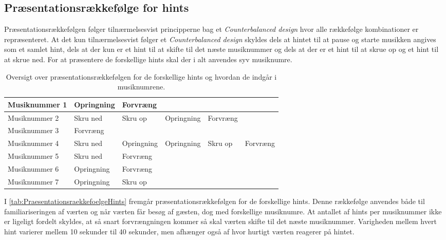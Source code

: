 \subsection{Præsentationsrækkefølge for hints}
\label{PraesentationsraekkefoelgeSocialAccept}
%
Præsentationsrækkefølgen følger tilnærmelsesvist principperne bag et \textit{Counterbalanced design} hvor alle rækkefølge kombinationer er repræsenteret. At det kun tilnærmelsesvist følger et \textit{Counterbalanced design} skyldes dels at hintet til at pause og starte musikken angives som et samlet hint, dels at der kun er et hint til at skifte til det næste musiknummer og dels at der er et hint til at skrue op og et hint til at skrue ned. For at præsentere de forskellige hints skal der i alt anvendes syv musiknumre.
%
\begin{table}[H]
	\centering
	\begin{tabular}{ | p{2.8cm}| p{1.85cm}| p{1.85cm} | p{1.85cm} | p{1.85cm} | p{1.85cm}|}
		\hline
		Musiknummer 1 & Opringning & Forvræng & & & \\ \hline
		Musiknummer 2 & Skru ned & Skru op & Opringning & Forvræng & \\ \hline
		Musiknummer 3 & Forvræng & & & &  \\ \hline
		Musiknummer 4 & Skru ned & Opringning & Opringning & Skru op & Forvræng\\ \hline
		Musiknummer 5 & Skru ned & Forvræng & & & \\ \hline
		Musiknummer 6 & Opringning & Forvræng & & & \\ \hline
		Musiknummer 7 & Opringning & Skru op & & & \\ \hline
	\end{tabular}
	\caption{Oversigt over præsentationsrækkefølgen for de forskellige hints og hvordan de indgår i musiknumrene.}
	\label{tab:PraesentationsraekkefoelgeHints}
\end{table}
\noindent
%
I \autoref{tab:PraesentationsraekkefoelgeHints} fremgår præsentationsrækkefølgen for de forskellige hints. Denne rækkefølge anvendes både til familiariseringen af værten og når værten får besøg af gæsten, dog med forskellige musiknumre. At antallet af hints per musiknummer ikke er ligeligt fordelt skyldes, at så snart forvrængningen kommer så skal værten skifte til det næste musiknummer. Varigheden mellem hvert hint varierer mellem 10 sekunder til 40 sekunder, men afhænger også af hvor hurtigt værten reagerer på hintet.   

